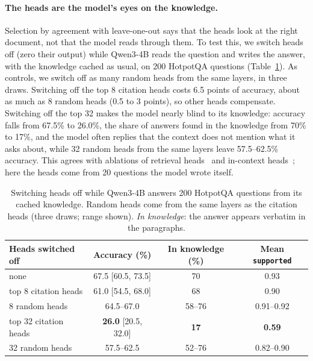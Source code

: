 \documentclass[11pt]{article}
\newcommand{\best}[1]{\textbf{#1}}
\begin{document}
\paragraph{The heads are the model's eyes on the knowledge.} Selection by agreement with leave-one-out says that the heads look at the right document, not that the model reads through them. To test this, we switch heads off (zero their output) while Qwen3-4B reads the question and writes the answer, with the knowledge cached as usual, on 200 HotpotQA questions (Table~\ref{tab:knockout}). As controls, we switch off as many random heads from the same layers, in three draws. Switching off the top 8 citation heads costs 6.5 points of accuracy, about as much as 8 random heads (0.5 to 3 points), so other heads compensate. Switching off the top 32 makes the model nearly blind to its knowledge: accuracy falls from 67.5\% to 26.0\%, the share of answers found in the knowledge from 70\% to 17\%, and the model often replies that the context does not mention what it asks about, while 32 random heads from the same layers leave 57.5--62.5\% accuracy. This agrees with ablations of retrieval heads~\citep{wu2024retrievalhead} and in-context heads~\citep{kahardipraja2025atlas}; here the heads come from 20 questions the model wrote itself.

\begin{table}[t]
\centering
\small
\caption{Switching heads off while Qwen3-4B answers 200 HotpotQA questions from its cached knowledge. Random heads come from the same layers as the citation heads (three draws; range shown). \emph{In knowledge}: the answer appears verbatim in the paragraphs.}
\label{tab:knockout}
\begin{tabular}{lccc}
\toprule
Heads switched off & Accuracy (\%) & In knowledge (\%) & Mean \texttt{supported} \\
\midrule
none & 67.5 [60.5, 73.5] & 70 & 0.93 \\
top 8 citation heads & 61.0 [54.5, 68.0] & 68 & 0.90 \\
8 random heads & 64.5--67.0 & 58--76 & 0.91--0.92 \\
top 32 citation heads & \best{26.0} [20.5, 32.0] & \best{17} & \best{0.59} \\
32 random heads & 57.5--62.5 & 52--76 & 0.82--0.90 \\
\bottomrule
\end{tabular}
\end{table}
\end{document}
